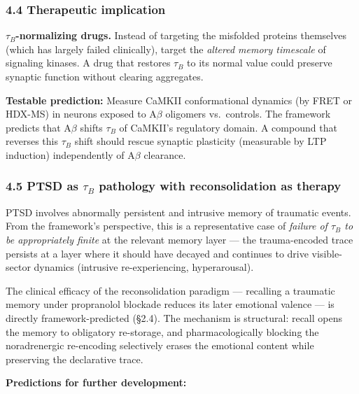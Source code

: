 \documentclass[
]{article}
\begin{document}
\hypertarget{therapeutic-implication}{%
\subsubsection{4.4 Therapeutic
implication}\label{therapeutic-implication}}

\textbf{\(\tau_B\)-normalizing drugs.} Instead of targeting the
misfolded proteins themselves (which has largely failed clinically),
target the \emph{altered memory timescale} of signaling kinases. A drug
that restores \(\tau_B\) to its normal value could preserve synaptic
function without clearing aggregates.

\textbf{Testable prediction:} Measure CaMKII conformational dynamics (by
FRET or HDX-MS) in neurons exposed to A\(\beta\) oligomers vs.~controls.
The framework predicts that A\(\beta\) shifts \(\tau_B\) of CaMKII's
regulatory domain. A compound that reverses this \(\tau_B\) shift should
rescue synaptic plasticity (measurable by LTP induction) independently
of A\(\beta\) clearance.

\hypertarget{ptsd-as-tau_b-pathology-with-reconsolidation-as-therapy}{%
\subsubsection{\texorpdfstring{4.5 PTSD as \(\tau_B\) pathology with
reconsolidation as
therapy}{4.5 PTSD as \textbackslash tau\_B pathology with reconsolidation as therapy}}\label{ptsd-as-tau_b-pathology-with-reconsolidation-as-therapy}}

PTSD involves abnormally persistent and intrusive memory of traumatic
events. From the framework's perspective, this is a representative case
of \emph{failure of \(\tau_B\) to be appropriately finite} at the
relevant memory layer --- the trauma-encoded trace persists at a layer
where it should have decayed and continues to drive visible-sector
dynamics (intrusive re-experiencing, hyperarousal).

The clinical efficacy of the reconsolidation paradigm --- recalling a
traumatic memory under propranolol blockade reduces its later emotional
valence --- is directly framework-predicted (§2.4). The mechanism is
structural: recall opens the memory to obligatory re-storage, and
pharmacologically blocking the noradrenergic re-encoding selectively
erases the emotional content while preserving the declarative trace.

\textbf{Predictions for further development:}
\end{document}
